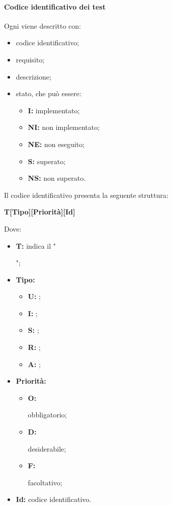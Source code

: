 {{\paragraph*{Codice identificativo dei test}
Ogni  viene descritto con:
\begin{itemize}
	\item codice identificativo;
	\item requisito;
	\item descrizione;
	\item stato, che può essere:
	\begin{itemize}
		\item \textbf{I:} implementato;
		\item \textbf{NI:} non implementato;
		\item \textbf{NE:} non eseguito;
		\item \textbf{S:} superato;
		\item \textbf{NS:} non superato.
	\end{itemize}
\end{itemize}
Il codice identificativo presenta la seguente struttura:\newline
\centerline{\textbf{T[Tipo][Priorità][Id]}}
\newline
Dove:
\begin{itemize}
	\item \textbf{T:} indica il "";
	\item \textbf{Tipo:}
		\begin{itemize}
			\item \textbf{U:} ;
			\item \textbf{I:} ;
			\item \textbf{S:} ;
			\item \textbf{R:} ;
			\item \textbf{A:} ;
		\end{itemize}
	\item \textbf{Priorità:}
		\begin{itemize}
			\item \textbf{O:}  obbligatorio;
			\item \textbf{D:}  desiderabile;
			\item \textbf{F:}  facoltativo;
		\end{itemize}
	\item \textbf{Id:} codice identificativo.
\end{itemize}

}}
